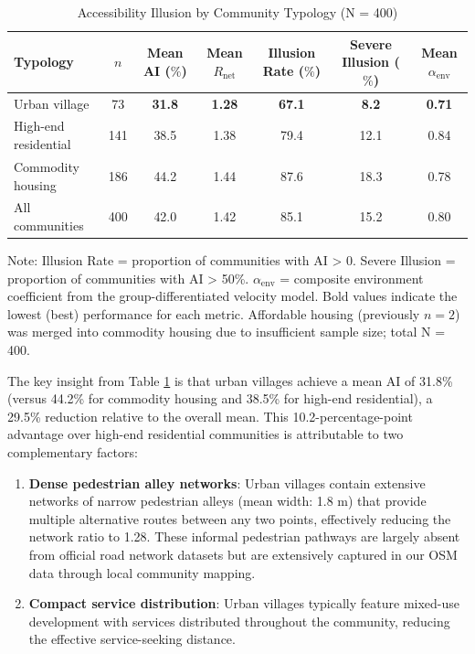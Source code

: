 \documentclass[10pt,conference,compsoc]{IEEEtran}
\begin{document}
\begin{table}[htbp]
\caption{Accessibility Illusion by Community Typology (N = 400)}
\label{tab:illusion_by_type}
\begin{center}
\begin{threeparttable}
\begin{tabular}{lcccccc}
\toprule
Typology & $n$ & Mean AI ($\%$) & Mean $R_{\text{net}}$ & Illusion Rate ($\%$) & Severe Illusion ($\%$) & Mean $\alpha_{\text{env}}$ \\
\midrule
Urban village & 73 & \textbf{31.8} & \textbf{1.28} & \textbf{67.1} & \textbf{8.2} & \textbf{0.71} \\
High-end residential & 141 & 38.5 & 1.38 & 79.4 & 12.1 & 0.84 \\
Commodity housing & 186 & 44.2 & 1.44 & 87.6 & 18.3 & 0.78 \\
\midrule
All communities & 400 & 42.0 & 1.42 & 85.1 & 15.2 & 0.80 \\
\bottomrule
\end{tabular}
\begin{tablenotes}
\item Note: Illusion Rate = proportion of communities with AI > 0. Severe Illusion = proportion of communities with AI > 50\%. $\alpha_{\text{env}}$ = composite environment coefficient from the group-differentiated velocity model. Bold values indicate the lowest (best) performance for each metric. Affordable housing (previously $n=2$) was merged into commodity housing due to insufficient sample size; total N = 400.
\end{tablenotes}
\end{threeparttable}

The key insight from Table \ref{tab:illusion_by_type} is that urban villages achieve a mean AI of 31.8\% (versus 44.2\% for commodity housing and 38.5\% for high-end residential), a 29.5\% reduction relative to the overall mean. This 10.2-percentage-point advantage over high-end residential communities is attributable to two complementary factors:

\begin{enumerate}
    \item \textbf{Dense pedestrian alley networks}: Urban villages contain extensive networks of narrow pedestrian alleys (mean width: 1.8 m) that provide multiple alternative routes between any two points, effectively reducing the network ratio to 1.28. These informal pedestrian pathways are largely absent from official road network datasets but are extensively captured in our OSM data through local community mapping.
    \item \textbf{Compact service distribution}: Urban villages typically feature mixed-use development with services distributed throughout the community, reducing the effective service-seeking distance.
\end{enumerate}


\end{center}
\end{table}
\end{document}
